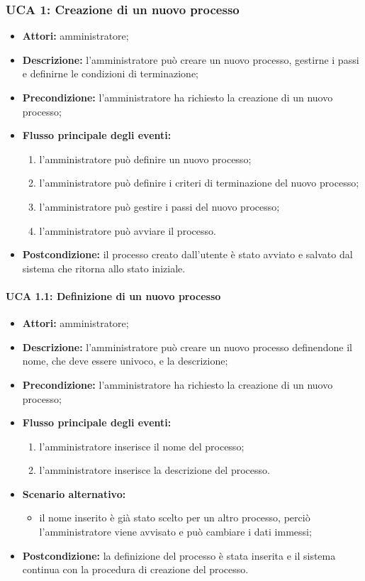 \subsubsection{UCA 1: Creazione di un nuovo processo}
\begin{itemize}
\item \textbf{Attori:}
amministratore;
\item \textbf{Descrizione:} 
l'amministratore può creare un nuovo processo, gestirne i passi e definirne le condizioni di terminazione;
\item \textbf{Precondizione:} l'amministratore ha richiesto la creazione di un nuovo processo;
\item \textbf{Flusso principale degli eventi:} 
\begin{enumerate}
\item l'amministratore può definire un nuovo processo;
\item l'amministratore può definire i criteri di terminazione del nuovo processo;
\item l'amministratore può gestire i passi del nuovo processo;
\item l'amministratore può avviare il processo.
\end{enumerate}
\item \textbf{Postcondizione:}
il processo creato dall'utente è stato avviato e salvato dal sistema che ritorna allo stato iniziale.
\end{itemize}

\paragraph{UCA 1.1: Definizione di un nuovo processo}
\begin{itemize}
\item \textbf{Attori:} 
amministratore;
\item \textbf{Descrizione:} 
l'amministratore può creare un nuovo processo definendone il nome, che deve essere univoco, e la descrizione;
\item \textbf{Precondizione:} l'amministratore ha richiesto la creazione di un nuovo processo;
\item \textbf{Flusso principale degli eventi:} 
\begin{enumerate}
\item l'amministratore inserisce il nome del processo;
\item l'amministratore inserisce la descrizione del processo.
\end{enumerate}
\item \textbf{Scenario alternativo:}
\begin{itemize}
\item il nome inserito è già stato scelto per un altro processo, perciò l'amministratore viene avvisato e può cambiare i dati immessi;
\end{itemize}
\item \textbf{Postcondizione:} 
la definizione del processo è stata inserita e il sistema continua con la procedura di creazione del processo.
\end{itemize}

